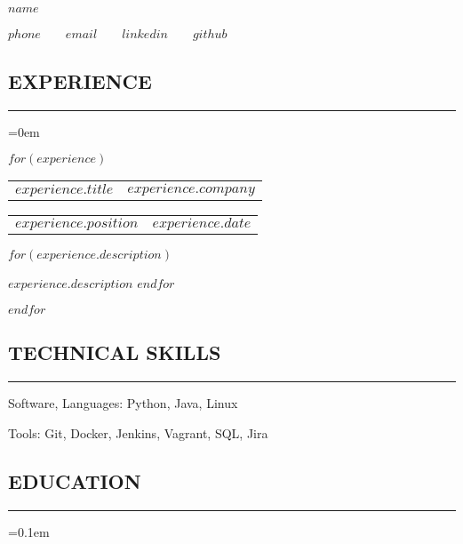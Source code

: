 \documentclass[10pt,letterpaper]{article}
\makeatletter
\newenvironment{indentsection}[1]%
{\begin{list}{}%
	{\setlength{\leftmargin}{#1}}%
	\item[]%
}
{\end{list}}
\newcommand{\headerrow}[2]
{\begin{tabular*}{\linewidth}{l@{\extracolsep{\fill}}r}
	#1 &
	#2 \\
\end{tabular*}}
\makeatother
\begin{document}
\begin{center}
{\LARGE \textbf{$name$}}
\vspace{0.4em}

$phone$\ \ \textbullet \ \
$email$\ \ \textbullet \ \
$linkedin$\ \ \textbullet \ \
$github$
\end{center}
\vspace{-16pt}

\subsection*{EXPERIENCE}
\vspace{-0.2em}
\hrule
\vspace{0.4em}
	\parskip=0em

    $for(experience)$
    \headerrow
		{\textbf{$experience.title$}}
		{\textbf{$experience.company$}}
	\vspace{-6pt}
	\headerrow
		{\emph{$experience.position$}}
		{\emph{$experience.date$}}
	\begin{itemize*}
        $for(experience.description)$
	    \item $experience.description$
        $endfor$
	\end{itemize*}
	\vspace{-4pt}
    $endfor$

\subsection*{TECHNICAL SKILLS}
\vspace{-0.2em}
\hrule
\vspace{0.4em}
	\begin{indentsection}{\parindent}
	\begin{description*}
		\item[Software, Languages:]
		Python, Java, Linux
		\item[Tools:]
		Git, Docker, Jenkins, Vagrant, SQL, Jira
	\end{description*}
	\end{indentsection}
	\vspace{-4pt}

\subsection*{EDUCATION}
\vspace{-0.2em}
\hrule
\vspace{0.4em}
\parskip=0.1em
\end{document}

